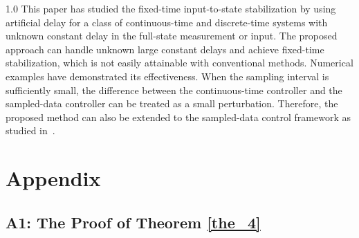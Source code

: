 \documentclass[journal]{IEEEtran}
\begin{document}
\begin{spacing}{1.0}
This paper has studied the fixed-time input-to-state stabilization by using artificial delay for a class of continuous-time
and discrete-time systems with unknown constant delay
in the full-state measurement or input. The proposed approach can
handle unknown large constant delays and achieve fixed-time stabilization,
which is not easily attainable with conventional methods. Numerical examples
have demonstrated its effectiveness. When the sampling interval is sufficiently small, the difference between the continuous-time controller and the sampled-data controller can be treated as a small perturbation. Therefore, the proposed method can also be extended to the sampled-data control framework as studied in~\cite{Mazenc25tac}.

\section*{Appendix}

\subsection*{A1: The Proof of Theorem \ref{the_4}}


\end{spacing}
\end{document}
